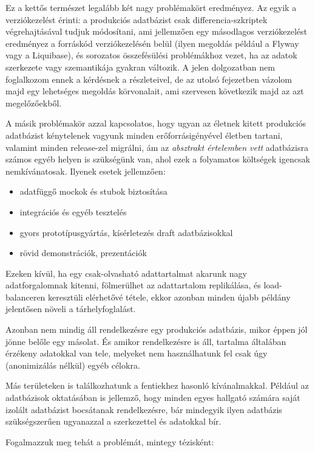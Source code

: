 \documentclass[
    parspace,
    noindent,
    nohyp,
]{elteiktdk}[2023/04/10]
\begin{document}
Ez a kettős természet legalább két nagy problémakört eredményez.
Az egyik a verziókezelést érinti:
a produkciós adatbázist csak differencia-szkriptek végrehajtásával tudjuk módosítani,
ami jellemzően egy másodlagos verziókezelést eredményez a forráskód verziókezelésén belül
(ilyen megoldás például a Flyway vagy a Liquibase),
és sorozatos összefésülési problémákhoz vezet, ha az adatok szerkezete vagy szemantikája gyakran változik.
A jelen dolgozatban nem foglalkozom ennek a kérdésnek a részleteivel,
de az utolsó fejezetben vázolom majd egy lehetséges megoldás körvonalait,
ami szervesen következik majd az azt megelőzőekből.

A másik problémakör azzal kapcsolatos, hogy ugyan az életnek kitett produkciós adatbázist
kénytelenek vagyunk minden erőforrásigényével életben tartani, valamint minden release-zel migrálni,
ám az \textit{absztrakt értelemben vett} adatbázisra számos egyéb helyen is szükségünk van,
ahol ezek a folyamatos költségek igencsak nemkívánatosak.
Ilyenek esetek jellemzően:

\begin{itemize}
    \item adatfüggő mockok és stubok biztosítása
    \item integrációs és egyéb tesztelés
    \item gyors prototípusgyártás, kísérletezés draft adatbázisokkal
    \item rövid demonstrációk, prezentációk
\end{itemize}

Ezeken kívül, ha egy csak-olvasható adattartalmat akarunk nagy adatforgalomnak kitenni,
fölmerülhet az adattartalom replikálása, és load-balanceren keresztüli elérhetővé tétele,
ekkor azonban minden újabb példány jelentősen növeli a tárhelyfoglalást.

Azonban nem mindig áll rendelkezésre egy produkciós adatbázis,
mikor éppen jól jönne belőle egy másolat.
És amikor rendelkezésre is áll, tartalma általában érzékeny adatokkal van tele,
melyeket nem használhatunk fel csak úgy (anonimizálás nélkül) egyéb célokra.

Más területeken is találkozhatunk a fentiekhez hasonló kívánalmakkal.
Például az adatbázisok oktatásában is jellemző, hogy minden egyes hallgató
számára saját izolált adatbázist bocsátanak rendelkezésre,
bár mindegyik ilyen adatbázis szükségszerűen ugyanazzal a szerkezettel és adatokkal bír.

Fogalmazzuk meg tehát a problémát, mintegy tézisként:
\end{document}
